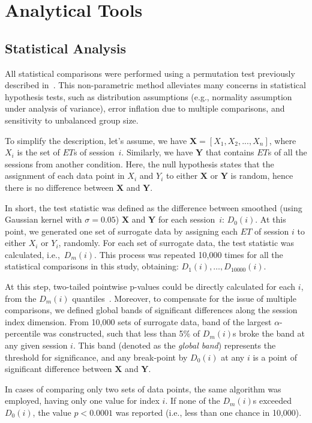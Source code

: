 \section{Analytical Tools} \label{ch:methods:tech}

\subsection{Statistical Analysis}
All statistical comparisons were performed using a permutation test previously described in~\cite{Fujisawa2008NN}.
This non-parametric method alleviates many concerns in statistical hypothesis tests, such as distribution assumptions (e.g., normality assumption under analysis of variance), error inflation due to multiple comparisons, and sensitivity to unbalanced group size.
\par
To simplify the description, let's assume, we have ${\mathbf{X}=[X_1, X_2,...,X_n]}$, where $X_i$ is the set of $ET$s of session~$i$.
Similarly, we have $\mathbf{Y}$ that contains $ET$s of all the sessions from another condition.
Here, the null hypothesis states that the assignment of each data point in $X_i$ and $Y_i$ to either $\mathbf{X}$ or $\mathbf{Y}$ is random, hence there is no difference between $\mathbf{X}$ and $\mathbf{Y}$.
\par
In short, the test statistic was defined as the difference between smoothed (using Gaussian kernel with $\sigma =0.05$) $\mathbf{X}$ and $\mathbf{Y}$ for each session~$i$: $D_0(i)$.
At this point, we generated one set of surrogate data by assigning each $ET$ of session $i$ to either $X_i$ or $Y_i$, randomly.
For each set of surrogate data, the test statistic was calculated, i.e.,~$D_m(i)$.
This process was repeated 10,000 times for all the statistical comparisons in this study, obtaining: $D_1(i),\ldots,D_{10000}(i)$.
\par
At this step, two-tailed pointwise p-values could be directly calculated for each $i$, from the $D_m(i)$ quantiles~\cite[see][]{Fujisawa2008NN}.
Moreover, to compensate for the issue of multiple comparisons, we defined global bands of significant differences along the session index dimension.
From 10,000 sets of surrogate data, band of the largest $\alpha$-percentile was constructed, such that less than 5\% of $D_m(i)$s broke the band at any given session $i$.
This band (denoted as the \textit{global band}) represents the threshold for significance, and any break-point by $D_0(i)$ at any $i$ is a point of significant difference between $\mathbf{X}$ and $\mathbf{Y}$.
\par
In cases of comparing only two sets of data points, the same algorithm was employed, having only one value for index $i$.
If none of the $D_m(i)$s exceeded $D_0(i)$, the value $p<0.0001$ was reported (i.e., less than one chance in 10,000).
